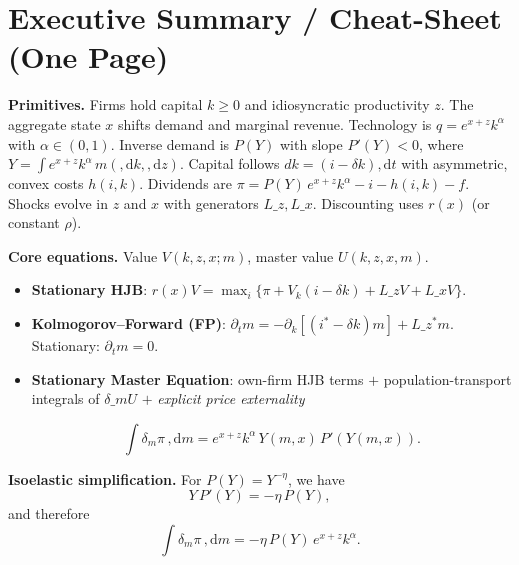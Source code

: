 \documentclass[11pt,letterpaper,oneside]{article}
\numberwithin{equation}{section}
\newcommand{\1}{\mathbf{1}}
\newcommand{\diff}{,\mathrm{d}}
\newcommand{\Lz}{L\_z}
\newcommand{\Lx}{L\_x}
\newcommand{\Lzadj}{L\_z^{\!*}}
\newcommand{\dmU}{\delta\_m U}
\begin{document}
\section*{Executive Summary / Cheat-Sheet (One Page)}
\begin{tcolorbox}[didacticstyle]
\textbf{Primitives.} Firms hold capital $k\!\ge 0$ and idiosyncratic productivity $z$. The aggregate state $x$ shifts demand and marginal revenue. Technology is $q=e^{x+z}k^\alpha$ with $\alpha\in(0,1)$. Inverse demand is $P(Y)$ with slope $P'(Y)<0$, where $Y=\int e^{x+z}k^\alpha\,m(\diff k,\diff z)$. Capital follows $dk=(i-\delta k)\diff t$ with asymmetric, convex costs $h(i,k)$. Dividends are $\pi = P(Y)\,e^{x+z}k^\alpha - i - h(i,k) - f$. Shocks evolve in $z$ and $x$ with generators $\Lz,\Lx$. Discounting uses $r(x)$ (or constant $\rho$).
\medskip

\textbf{Core equations.} Value $V(k,z,x;m)$, master value $U(k,z,x,m)$.
\begin{itemize}[leftmargin=1.25em]
\item \textbf{Stationary HJB}: $r(x)V=\max_i\{\pi+V_k(i-\delta k)+\Lz V+\Lx V\}$.
\item \textbf{Kolmogorov--Forward (FP)}: $\partial_t m=-\partial_k[(i^*-\delta k)m]+\Lzadj m$. Stationary: $\partial_t m=0$.
\item \textbf{Stationary Master Equation}: own-firm HJB terms $+$ population-transport integrals of $\dmU$ $+$ \emph{explicit price externality}

$$
\int \delta_m \pi\,\diff m = e^{x+z}k^\alpha\,Y(m,x)\,P'(Y(m,x)).
$$

\end{itemize}


\textbf{Isoelastic simplification.} For $P(Y)=Y^{-\eta}$, we have
\[
Y\,P'(Y)=-\eta\,P(Y),
\]
and therefore
\[
\int \delta_m \pi\,\diff m = -\eta\,P(Y)\,e^{x+z}k^\alpha.
\]


\end{tcolorbox}
\end{document}
